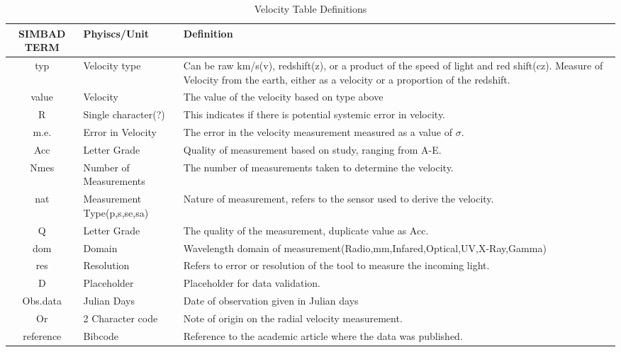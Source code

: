 \documentclass[12pt,oneside,a4paper,english]{article}
\begin{document}
    \begin{table}[H]
    \centering
    \caption{Velocity Table Definitions}
    \begin{tabular}{|c|p{3cm}|p{9cm}|}
    \centering
    \textbf{SIMBAD TERM} & \textbf{Phyiscs/Unit} & \textbf{Definition} \\ \hline \hline
    typ & Velocity type & Can be raw km/s(v), redshift(z), or a product of the speed of light and red shift(cz). Measure of Velocity from the earth, either as a velocity or a proportion of the redshift.  \\ \hline
    value & Velocity & The value of the velocity based on type above  \\ \hline
    R & Single character(?) & This indicates if there is potential systemic error in velocity.  \\ \hline
    m.e. & Error in Velocity & The error in the velocity measurement measured as a value of $\sigma$.  \\ \hline
    Acc & Letter Grade & Quality of measurement based on study, ranging from A-E.  \\ \hline
    Nmes & Number of Measurements & The number of measurements taken to determine the velocity.  \\ \hline
    nat & Measurement Type(p,s,se,sa) & Nature of measurement, refers to the sensor used to derive the velocity.\\ \hline
    Q & Letter Grade & The quality of the measurement, duplicate value as Acc.  \\ \hline
    dom & Domain & Wavelength domain of measurement(Radio,mm,Infared,Optical,UV,X-Ray,Gamma)  \\ \hline
    res & Resolution & Refers to error or resolution of the tool to measure the incoming light. \\ \hline
    D & Placeholder & Placeholder for data validation.  \\ \hline
    Obs.data & Julian Days & Date of observation given in Julian days \\ \hline
    Or & 2 Character code & Note of origin on the radial velocity measurement.  \\ \hline
    reference & Bibcode & Reference to the academic article where the data was published.  \\ \hline
    \end{tabular}
    \label{tab:table2}
\end{table}
\end{document}
